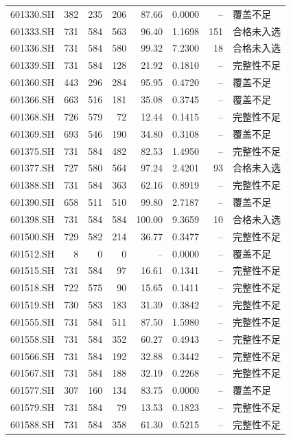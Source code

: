 \documentclass[10pt,a4paper]{article}
\begin{document}
\begin{longtable}{lrrr r r r l}
601330.SH & 382 & 235 & 206 & 87.66 & 0.0000 & -- & 覆盖不足\\
601333.SH & 731 & 584 & 563 & 96.40 & 1.1698 & 151 & 合格未入选\\
601336.SH & 731 & 584 & 580 & 99.32 & 7.2300 & 18 & 合格未入选\\
601339.SH & 731 & 584 & 128 & 21.92 & 0.1810 & -- & 完整性不足\\
601360.SH & 443 & 296 & 284 & 95.95 & 0.4720 & -- & 覆盖不足\\
601366.SH & 663 & 516 & 181 & 35.08 & 0.3745 & -- & 覆盖不足\\
601368.SH & 726 & 579 & 72 & 12.44 & 0.1415 & -- & 完整性不足\\
601369.SH & 693 & 546 & 190 & 34.80 & 0.3108 & -- & 覆盖不足\\
601375.SH & 731 & 584 & 482 & 82.53 & 1.4950 & -- & 完整性不足\\
601377.SH & 727 & 580 & 564 & 97.24 & 2.4201 & 93 & 合格未入选\\
601388.SH & 731 & 584 & 363 & 62.16 & 0.8919 & -- & 完整性不足\\
601390.SH & 658 & 511 & 510 & 99.80 & 2.7187 & -- & 覆盖不足\\
601398.SH & 731 & 584 & 584 & 100.00 & 9.3659 & 10 & 合格未入选\\
601500.SH & 729 & 582 & 214 & 36.77 & 0.3477 & -- & 完整性不足\\
601512.SH & 8 & 0 & 0 & -- & 0.0000 & -- & 覆盖不足\\
601515.SH & 731 & 584 & 97 & 16.61 & 0.1341 & -- & 完整性不足\\
601518.SH & 722 & 575 & 90 & 15.65 & 0.1411 & -- & 完整性不足\\
601519.SH & 730 & 583 & 183 & 31.39 & 0.3842 & -- & 完整性不足\\
601555.SH & 731 & 584 & 511 & 87.50 & 1.5980 & -- & 完整性不足\\
601558.SH & 731 & 584 & 352 & 60.27 & 0.4943 & -- & 完整性不足\\
601566.SH & 731 & 584 & 192 & 32.88 & 0.3442 & -- & 完整性不足\\
601567.SH & 731 & 584 & 188 & 32.19 & 0.2268 & -- & 完整性不足\\
601577.SH & 307 & 160 & 134 & 83.75 & 0.0000 & -- & 覆盖不足\\
601579.SH & 731 & 584 & 79 & 13.53 & 0.1823 & -- & 完整性不足\\
601588.SH & 731 & 584 & 358 & 61.30 & 0.5215 & -- & 完整性不足\\

\end{longtable}
\end{document}
